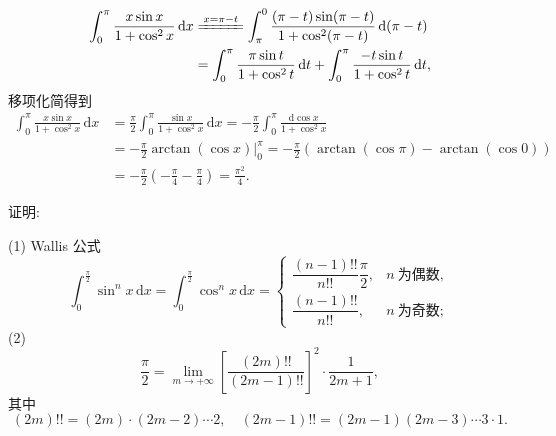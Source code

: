 \begin{solution}
\begin{align*}
\int_{0}^{\pi}\frac{x\sin x}{1+\cos^{2}x}\,\mathrm{d}x&\xlongequal{x=\pi-t}\int_{\pi}^{0}\frac{(\pi-t)\sin(\pi-t)}{1+\cos^{2}(\pi-t)}\,\mathrm{d}(\pi-t)\\
&=\int_{0}^{\pi}\frac{\pi\sin t}{1+\cos^{2}t}\,\mathrm{d}t+\int_{0}^{\pi}\frac{-t\sin t}{1+\cos^{2}t}\,\mathrm{d}t,
\end{align*}
移项化简得到
\begin{align*}
\int_{0}^{\pi}\frac{x\sin x}{1+\cos^{2}x}\,\mathrm{d}x&=\frac{\pi}{2}\int_{0}^{\pi}\frac{\sin x}{1+\cos^{2}x}\,\mathrm{d}x=-\frac{\pi}{2}\int_{0}^{\pi}\frac{\mathrm{d}\cos x}{1+\cos^{2}x}\\
&=-\frac{\pi}{2}\arctan(\cos x)\Bigg|_{0}^{\pi}=-\frac{\pi}{2}\left(\arctan(\cos\pi)-\arctan(\cos0)\right)\\
&=-\frac{\pi}{2}\left(-\frac{\pi}{4}-\frac{\pi}{4}\right)=\frac{\pi^{2}}{4}.
\end{align*}
\end{solution}

\begin{example}\label{ex:6.4.5}
证明:

(1) Wallis 公式
\[
\int_{0}^{\frac{\pi}{2}}\sin^{n}x\,\mathrm{d}x=\int_{0}^{\frac{\pi}{2}}\cos^{n}x\,\mathrm{d}x=\begin{cases}\dfrac{(n-1)!!}{n!!}\dfrac{\pi}{2}, & n\ \text{为偶数},\\[3mm]\dfrac{(n-1)!!}{n!!}, & n\ \text{为奇数};\end{cases}
\]
(2)
\[
\frac{\pi}{2}=\lim_{m\to+\infty}\left[\frac{(2m)!!}{(2m-1)!!}\right]^{2}\cdot\frac{1}{2m+1},
\]
其中
\[
(2m)!!=(2m)\cdot(2m-2)\cdots2,\quad(2m-1)!!=(2m-1)(2m-3)\cdots3\cdot1.
\]
\end{example}

